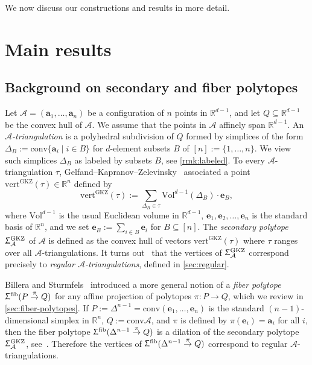 \documentclass[11pt]{amsart}
\theoremstyle{plain}
\theoremstyle{definition}
\def\R{\mathbb{R}}
\def\A{\mathcal{A}}
\def\e{{\bm{e}}}
\def\a{{\bm{a}}}
\def\conv{\mathrm{conv}}
\def\Tr{\tau}
\def\Vol{\mathrm{Vol}}
\def\GKZ{{\operatorname{GKZ}}}
\def\vert{\mathrm{vert}}
\def\vertGKZ{\vert^\GKZ}
\def\fiber{{\operatorname{fib}}}
\def\FibPoly{\Upsigma^\fiber}
\def\SigmaGKZ{\Upsigma_\A^{\GKZ}}
\def\pito{\overset \pi \to}
\def\VolDB{\Vol^{d-1}(\Delta_B)}
\let\subset\subseteq
\begin{document}
We now discuss our constructions and results in more detail. 

\section{Main results}\label{sec:main-results}
\subsection{Background on secondary and fiber polytopes}
Let $\A=(\a_1,\dots,\a_n)$ be a configuration of $n$ points in $\R^{d-1}$, and let $Q\subset\R^{d-1}$ be the convex hull of $\A$. We assume that the points in $\A$ affinely span $\R^{d-1}$. An \emph{$\A$-triangulation}
	is a polyhedral subdivision of $Q$ formed by simplices of the form
 $\Delta_{B}:=\conv\{\a_i\mid i \in B\}$ 
for $d$-element subsets $B$ of $[n]:=\{1,\dots,n\}$.
We view such simplices $\Delta_B$ as labeled by subsets $B$, see \cref{rmk:labeled}. To every $\A$-triangulation $\Tr$, Gelfand--Kapranov--Zelevinsky~\cite{GKZ} associated a point $\vertGKZ(\Tr)\in\R^n$ defined by
\begin{equation}	\label{eq:defGKZ}
\vertGKZ(\Tr):=\sum_{\Delta_B\in \Tr} \VolDB\cdot  \e_B,
\end{equation}
where $\Vol^{d-1}$ is the usual Euclidean volume in $\R^{d-1}$, $\e_1,\e_2,\dots,\e_n$ is the standard basis of $\R^n$, and we set  $\e_B:=\sum_{i\in B}\e_i$ for $B\subset [n]$. The \emph{secondary polytope} $\SigmaGKZ$ of $\A$ is defined as the convex hull of vectors $\vertGKZ(\Tr)$ where $\Tr$ ranges over all $\A$-triangulations. It turns out~\cite[Chapter~7, Theorem~1.7]{GKZ} that the vertices of $\SigmaGKZ$ correspond precisely to \emph{regular $\A$-triangulations}, defined in \cref{sec:regular}.




 Billera and Sturmfels~\cite{BS}  introduced a more general notion of a \emph{fiber
polytope} $\FibPoly(P\pito Q)$ 
for any affine projection of polytopes 
$\pi:P\to Q$,
 which we review in 
\cref{sec:fiber-polytopes}.
If $P:=\Delta^{n-1}=\conv(\e_1,\dots,\e_n)$ is the standard
$(n-1)$-dimensional simplex in $\R^n$, $Q:=\conv{\A}$, and $\pi$ is defined by $\pi(\e_i) = \a_i$ for all $i$, 
then the fiber polytope 
$\FibPoly(\Delta^{n-1}\pito Q)$ is a dilation of the secondary 
polytope $\SigmaGKZ$, see~\cite[Theorem~2.5]{BS}. Therefore the vertices of
	$\FibPoly(\Delta^{n-1}\pito Q)$
correspond to regular $\A$-triangulations. 
\end{document}
